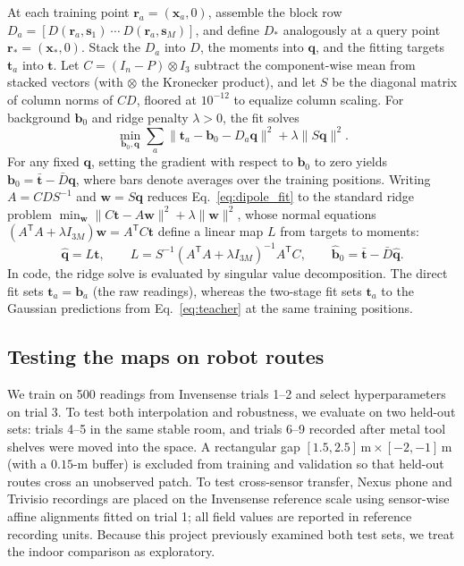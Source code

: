 \documentclass[11pt]{article}
\newcommand{\x}{\mathbf x}
\newcommand{\rr}{\mathbf r}
\newcommand{\bvec}{\mathbf b}
\begin{document}
At each training point \(\rr_a=(\x_a,0)\), assemble the block row
\(D_a=[D(\rr_a,\mathbf s_1)\ \cdots\ D(\rr_a,\mathbf s_M)]\), and define
\(D_*\) analogously at a query point \(\rr_*=(\x_*,0)\). Stack the \(D_a\) into
\(D\), the moments into \(\mathbf q\), and the fitting targets \(\mathbf t_a\)
into \(\mathbf t\). Let \(C=(I_n-P)\otimes I_3\) subtract the component-wise
mean from stacked vectors (with \(\otimes\) the Kronecker product), and let
\(S\) be the diagonal matrix of column norms of \(CD\), floored at \(10^{-12}\)
to equalize column scaling. For background \(\bvec_0\) and ridge penalty
\(\lambda>0\), the fit solves
\begin{equation}
 \min_{\bvec_0,\mathbf q}
 \sum_a\|\mathbf t_a-\bvec_0-D_a\mathbf q\|^2+\lambda\|S\mathbf q\|^2.
 \label{eq:dipole_fit}
\end{equation}
For any fixed \(\mathbf q\), setting the gradient with respect to \(\bvec_0\)
to zero yields \(\bvec_0=\bar{\mathbf t}-\bar D\mathbf q\), where bars denote
averages over the training positions. Writing \(A=CDS^{-1}\) and
\(\mathbf w=S\mathbf q\) reduces Eq.~\eqref{eq:dipole_fit} to the standard
ridge problem \(\min_{\mathbf w}\|C\mathbf t-A\mathbf w\|^2+\lambda\|\mathbf w\|^2\),
whose normal equations \((A^{\mathsf T}A+\lambda I_{3M})\mathbf w=A^{\mathsf T}C\mathbf t\)
define a linear map \(L\) from targets to moments:
\begin{equation}
 \widehat{\mathbf q}=L\mathbf t,\qquad
 L=S^{-1}(A^{\mathsf T}A+\lambda I_{3M})^{-1}A^{\mathsf T}C,\qquad
 \widehat{\bvec}_0=\bar{\mathbf t}-\bar D\widehat{\mathbf q}.
 \label{eq:ridge}
\end{equation}
In code, the ridge solve is evaluated by singular value decomposition. The
direct fit sets \(\mathbf t_a=\bvec_a\) (the raw readings), whereas the
two-stage fit sets \(\mathbf t_a\) to the Gaussian predictions from
Eq.~\eqref{eq:teacher} at the same training positions.

\subsection{Testing the maps on robot routes}

We train on 500 readings from Invensense trials 1--2 and select hyperparameters
on trial 3. To test both interpolation and robustness, we evaluate on two
held-out sets: trials 4--5 in the same stable room, and trials 6--9 recorded
after metal tool shelves were moved into the space. A rectangular gap
\([1.5,2.5]\,\mathrm m\times[-2,-1]\,\mathrm m\) (with a \(0.15\)-m buffer) is
excluded from training and validation so that held-out routes cross an
unobserved patch. To test cross-sensor transfer, Nexus phone and Trivisio
recordings are placed on the Invensense reference scale using sensor-wise
affine alignments fitted on trial 1; all field values are reported in reference
recording units. Because this project previously examined both test sets, we
treat the indoor comparison as exploratory.
\end{document}
